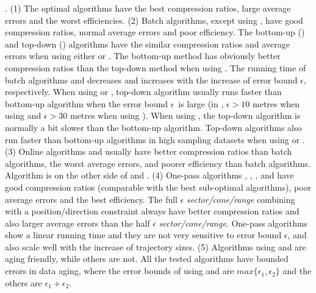 .
(1) The optimal algorithms have the best compression ratios, large average errors and the worst efficiencies.
%
(2) Batch algorithms, except \dpa using \dad, have good compression ratios, normal average errors and poor efficiency.
%
The bottom-up (\tpa) and top-down (\dpa) algorithms have the similar compression ratios and average errors when using either \ped or \sed. The bottom-up method has obviously better compression ratios than the top-down method when using \dad.
%
The running time of batch algorithms \dpa and \tpa decreases and increases with the increase of error bound $\epsilon$, respectively. When using \ped or \sed, top-down algorithm \dpa usually runs faster than bottom-up algorithm \tpa when the error bound $\epsilon$~is large  (\eg in \geolife, $\epsilon >10$ metres when using \ped and $\epsilon >30$ metres when using \sed). When using \dad, the top-down algorithm is normally a bit slower than the bottom-up algorithm.
Top-down algorithms also run faster than bottom-up algorithms in high sampling datasets when using \ped or \sed.
%
(3) Online algorithms \opwa and \bqsa usually have better compression ratios than batch algorithms, the worst average errors, and poorer efficiency than batch algorithms. Algorithm \squishe is on the other side of \opwa and \bqsa.
%
(4) One-pass algorithms \operb, \siped, \cised, \intersec and \interval have good compression ratios (comparable with the best sub-optimal algorithms), poor average errors and the best efficiency.
%
The full $\epsilon$ \emph{sector/cone/range} combining with a position/direction constraint always have better compression ratios and also larger average errors than the half $\epsilon$ \emph{sector/cone/range}. %
%
One-pass algorithms show a linear running time and they are not very sensitive to error bound $\epsilon$, and also scale well with the increase of trajectory sizes.
%
(5) {Algorithms \dpa using \ped and \sed are aging friendly, while others are not. All the tested algorithms have bounded errors in data aging, where the error bounds of \dpa using \ped and \sed are $max\{\epsilon_1, \epsilon_2\}$ and the others are $\epsilon_1 + \epsilon_2$.}

